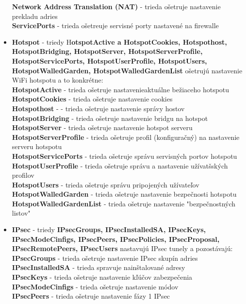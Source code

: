 \begin{itemize}
\textbf{Network Address Translation (NAT)} - trieda ošetruje  nastavenie prekladu adries\\
\textbf{ServicePorts} - trieda ošetreuje servisné porty nastavené na firewalle
\item \textbf{Hotspot} - triedy H\textbf{otspotActive a HotspotCookies, Hotspothost, HotspotBridging, HotspotServer, HotspotServerProfile, HotspotServicePorts, HotspotUserProfile, HotspotUsers, HotspotWalledGarden, HotspotWalledGardenList} ošetrujú nastavenie WiFi hotspotu  a to konkrétne:\\
\textbf{HotspotActive} - trieda ošetruje nastavenieaktuálne bežiaceho hotspotu\\
\textbf{HotspotCookies} - trieda ošetruje nastavenie cookies\\
\textbf{Hotspothost} - - trieda ošetruje nastavenie správy hostov\\
\textbf{HotspotBridging} - trieda ošetruje nastavenie bridgu na hotspot\\
\textbf{HotspotServer} - trieda ošetruje nastavenie hotspot serveru\\
\textbf{HotspotServerProfile} - trieda ošetruje profil (konfiguračný) na nastavenie serveru hotspotu\\
\textbf{HotspotServicePorts} - trieda ošetruje správu servisných portov hotspotu\\
\textbf{HotspotUserProfile} - trieda ošetruje správu a nastavenie užívatšských profilov\\
\textbf{HotspotUsers} - trieda ošetruje správu pripojených užívateľov\\
\textbf{HotspotWalledGarden} - trieda ošetruje nastavenie bezpečnosti hotspotu\\
\textbf{HotspotWalledGardenList} - trieda ošetruje nastavenie "bezpečnostných listov"
\item \textbf{IPsec} - triedy \textbf{IPsecGroups, IPsecInstalledSA, IPsecKeys, IPsecModeCinfigs, IPsecPeers, IPsecPolicies, IPsecProposal, IPsecRemotePeers, IPsecUsers} nastavujú IPsec tunely a pozostávajú:\\
\textbf{IPsecGroups} - trieda ošetruje nastavenie IPsec skupín adries\\
\textbf{IPsecInstalledSA} - trieda spravuje nainštalované adresy\\
\textbf{IPsecKeys} - trieda ošetruje nastavenie kľúčov zabezpečenia\\
\textbf{IPsecModeCinfigs} - trieda ošetruje nastavenie módov\\
\textbf{IPsecPeers} - trieda ošetruje nastavenie fázy 1 IPsec\\

\end{itemize}

